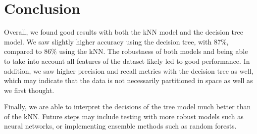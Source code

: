 \documentclass{article}
\begin{document}
\section{Conclusion}

Overall, we found good results with both the kNN model and the decision tree model. We saw slightly higher accuracy using the decision tree, with 87\%, compared to 86\% using the kNN. The robustness of both models and being able to take into account all features of the dataset likely led to good performance. In addition, we saw higher precision and recall metrics with the decision tree as well, which may indicate that the data is not necessarily partitioned in space as well as we first thought.

Finally, we are able to interpret the decisions of the tree model much better than of the kNN. Future steps may include testing with more robust models such as neural networks, or implementing ensemble methods such as random forests.
\end{document}
